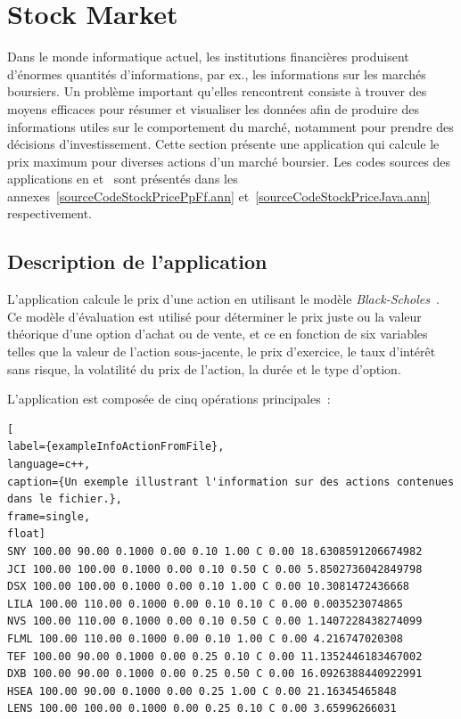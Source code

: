 \section{Stock Market}
\label{stockprice.sect}


Dans le monde informatique actuel, les institutions financi\`eres produisent d'\'enormes quantit\'es d'informations, par ex., les informations sur les march\'es boursiers. Un probl\`eme important qu'elles rencontrent consiste \`a trouver des moyens efficaces pour r\'esumer et visualiser les donn\'ees afin de produire des informations utiles sur le comportement du march\'e, notamment pour prendre des d\'ecisions d'investissement. Cette section pr\'esente une application qui calcule le prix maximum pour diverses actions d'un marché boursier. Les codes sources des applications  en  et~ sont pr\'esent\'es dans les annexes~\ref{sourceCodeStockPricePpFf.ann} et~\ref{sourceCodeStockPriceJava.ann} respectivement. 

\subsection{Description de l'application}

L'application  calcule le prix d'une action en utilisant le modèle \emph{Black-Scholes}~\citep{macbeth1979empirical}. Ce mod\`ele d'\'evaluation est utilis\'e pour d\'eterminer le prix juste ou la valeur th\'eorique d'une option d'achat ou de vente, et ce en fonction de six variables telles que la valeur de l'action sous-jacente, le prix d'exercice, le taux d'int\'er\^et sans risque, la volatilit\'e du prix de l'action, la dur\'ee et le type d'option. 

L'application  est compos\'ee de cinq op\'erations principales~: 

\begin{lstlisting}[
label={exampleInfoActionFromFile},
language=c++,
caption={Un exemple illustrant l'information sur des actions contenues dans le fichier.},
frame=single,
float]
SNY 100.00 90.00 0.1000 0.00 0.10 1.00 C 0.00 18.6308591206674982
JCI 100.00 100.00 0.1000 0.00 0.10 0.50 C 0.00 5.8502736042849798
DSX 100.00 100.00 0.1000 0.00 0.10 1.00 C 0.00 10.3081472436668
LILA 100.00 110.00 0.1000 0.00 0.10 0.10 C 0.00 0.003523074865
NVS 100.00 110.00 0.1000 0.00 0.10 0.50 C 0.00 1.1407228438274099
FLML 100.00 110.00 0.1000 0.00 0.10 1.00 C 0.00 4.216747020308
TEF 100.00 90.00 0.1000 0.00 0.25 0.10 C 0.00 11.1352446183467002
DXB 100.00 90.00 0.1000 0.00 0.25 0.50 C 0.00 16.0926388440922991
HSEA 100.00 90.00 0.1000 0.00 0.25 1.00 C 0.00 21.16345465848
LENS 100.00 100.00 0.1000 0.00 0.25 0.10 C 0.00 3.65996266031
\end{lstlisting}


